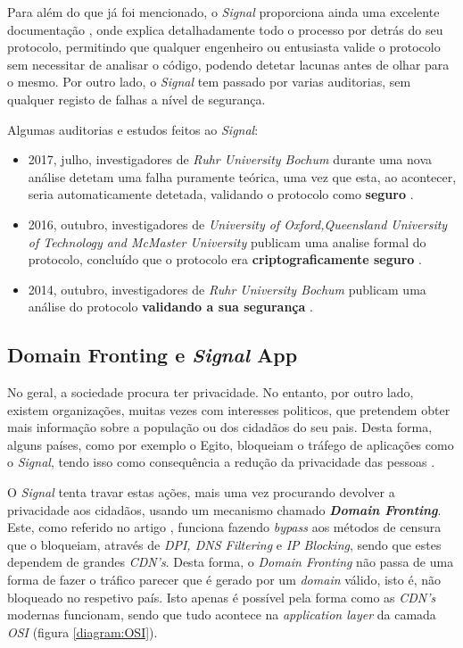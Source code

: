 Para além do que já foi mencionado, o \textit{Signal} proporciona ainda uma excelente documentação \cite{signal}, onde explica detalhadamente todo o processo por detrás do seu protocolo, permitindo que qualquer engenheiro ou entusiasta valide o protocolo sem necessitar de analisar o código, podendo detetar lacunas antes de olhar para o mesmo. Por outro lado, o \textit{Signal} tem passado por varias auditorias, sem qualquer registo de falhas a nível de segurança.

Algumas auditorias e estudos feitos ao \textit{Signal}:
\begin{itemize}
    \item 2017, julho, investigadores de \textit{Ruhr University Bochum} durante uma nova análise detetam uma falha puramente teórica, uma vez que esta, ao acontecer, seria automaticamente detetada, validando o protocolo como \textbf{seguro} \cite{rosler2018more}.
    
    \item 2016, outubro, investigadores de \textit{University of Oxford,Queensland University of Technology and McMaster University} publicam uma analise formal do protocolo, concluído que o protocolo era \textbf{criptograficamente seguro} \cite{cohn2017formal}.

    \item 2014, outubro, investigadores de \textit{Ruhr University Bochum} publicam uma análise do protocolo \textbf{validando a sua segurança} \cite{frosch2016secure}.
\end{itemize}


\subsection{Domain Fronting e \textit{Signal} App}
No geral, a sociedade procura ter privacidade. No entanto, por outro lado, existem organizações, muitas vezes com interesses politicos, que pretendem obter mais informação sobre a população ou dos cidadãos do seu pais. Desta forma, alguns países, como por exemplo o Egito, bloqueiam o tráfego de aplicações como o \textit{Signal}, tendo isso como consequência a redução da privacidade das pessoas \cite{noSignal}.

O \textit{Signal} tenta travar estas ações, mais uma vez procurando devolver a privacidade aos cidadãos, usando um mecanismo chamado \textbf{\textit{Domain Fronting}}. Este, como referido no artigo \cite{domainFrontingExplained}, funciona fazendo \textit{bypass} aos métodos de censura que o bloqueiam, através de \textit{DPI, DNS Filtering} e \textit{IP Blocking}, sendo que estes dependem de grandes \textit{CDN's}. Desta forma, o \textit{Domain Fronting} não passa de uma forma de fazer o tráfico parecer que é gerado por um \textit{domain} válido, isto é, não bloqueado no respetivo país. Isto apenas é possível pela forma como as \textit{CDN's} modernas funcionam, sendo que tudo acontece na \textit{application layer} da camada \textit{OSI} (figura \ref{diagram:OSI}). 

